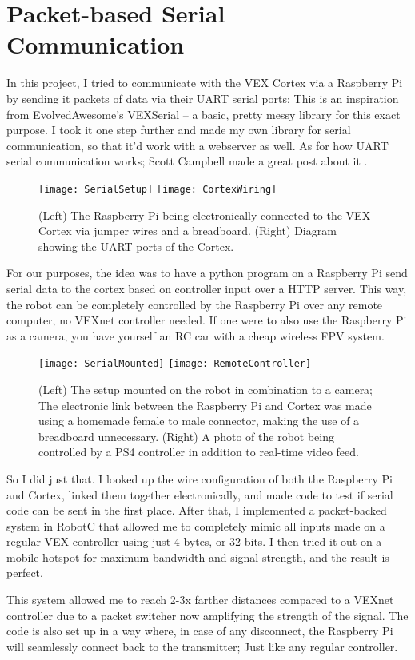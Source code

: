 \section{Packet-based Serial Communication}
In this project, I tried to communicate with the VEX Cortex via a Raspberry Pi by sending it packets of data via their UART serial ports; This is an inspiration from EvolvedAwesome's VEXSerial \cite{VEXSerial} -- a basic, pretty messy library for this exact purpose. I took it one step further and made my own library for serial communication, so that it'd work with a webserver as well. As for how UART serial communication works; Scott Campbell made a great post about it \cite{UARTBasic}.

\begin{figure}[h]
    \centering
    \texttt{[image: SerialSetup]}
    \texttt{[image: CortexWiring]}
    \caption{
        (Left) The Raspberry Pi being electronically connected to the VEX Cortex via jumper wires and a breadboard. (Right) Diagram showing the UART ports of the Cortex. \cite{CortexWiringCite}
    }
\end{figure}

For our purposes, the idea was to have a python program on a Raspberry Pi send serial data to the cortex based on controller input over a HTTP server. This way, the robot can be completely controlled by the Raspberry Pi over any remote computer, no VEXnet controller needed. If one were to also use the Raspberry Pi as a camera, you have yourself an RC car with a cheap wireless FPV system.

\begin{figure}[h]
    \centering
    \texttt{[image: SerialMounted]}
    \texttt{[image: RemoteController]}
    \caption {
        (Left) The setup mounted on the robot in combination to a camera; The electronic link between the Raspberry Pi and Cortex was made using a homemade female to male connector, making the use of a breadboard unnecessary. (Right) A photo of the robot being controlled by a PS4 controller in addition to real-time video feed.
    }
\end{figure}

So I did just that. I looked up the wire configuration of both the Raspberry Pi and Cortex, linked them together electronically, and made code to test if serial code can be sent in the first place. After that, I implemented a packet-backed system in RobotC that allowed me to completely mimic all inputs made on a regular VEX controller using just 4 bytes, or 32 bits. I then tried it out on a mobile hotspot for maximum bandwidth and signal strength, and the result is perfect.

This system allowed me to reach 2-3x farther distances compared to a VEXnet controller due to a packet switcher now amplifying the strength of the signal. The code is also set up in a way where, in case of any disconnect, the Raspberry Pi will seamlessly connect back to the transmitter; Just like any regular controller.


